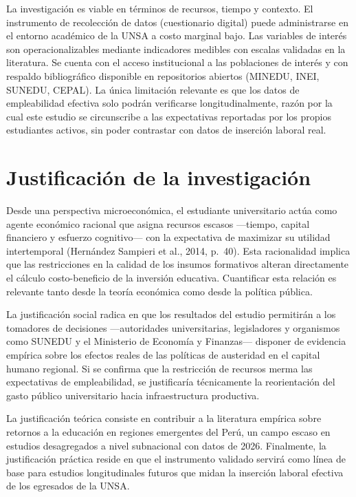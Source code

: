 \documentclass[11pt, a4paper]{article}
\begin{document}
La investigación es viable en términos de recursos, tiempo y contexto. El instrumento de recolección de datos (cuestionario digital) puede administrarse en el entorno académico de la UNSA a costo marginal bajo. Las variables de interés son operacionalizables mediante indicadores medibles con escalas validadas en la literatura. Se cuenta con el acceso institucional a las poblaciones de interés y con respaldo bibliográfico disponible en repositorios abiertos (MINEDU, INEI, SUNEDU, CEPAL). La única limitación relevante es que los datos de empleabilidad efectiva solo podrán verificarse longitudinalmente, razón por la cual este estudio se circunscribe a las expectativas reportadas por los propios estudiantes activos, sin poder contrastar con datos de inserción laboral real.

\section{Justificación de la investigación}

Desde una perspectiva microeconómica, el estudiante universitario actúa como agente económico racional que asigna recursos escasos —tiempo, capital financiero y esfuerzo cognitivo— con la expectativa de maximizar su utilidad intertemporal (Hernández Sampieri et al., 2014, p.~40). Esta racionalidad implica que las restricciones en la calidad de los insumos formativos alteran directamente el cálculo costo-beneficio de la inversión educativa. Cuantificar esta relación es relevante tanto desde la teoría económica como desde la política pública.

La justificación social radica en que los resultados del estudio permitirán a los tomadores de decisiones —autoridades universitarias, legisladores y organismos como SUNEDU y el Ministerio de Economía y Finanzas— disponer de evidencia empírica sobre los efectos reales de las políticas de austeridad en el capital humano regional. Si se confirma que la restricción de recursos merma las expectativas de empleabilidad, se justificaría técnicamente la reorientación del gasto público universitario hacia infraestructura productiva.

La justificación teórica consiste en contribuir a la literatura empírica sobre retornos a la educación en regiones emergentes del Perú, un campo escaso en estudios desagregados a nivel subnacional con datos de 2026. Finalmente, la justificación práctica reside en que el instrumento validado servirá como línea de base para estudios longitudinales futuros que midan la inserción laboral efectiva de los egresados de la UNSA.
\end{document}
